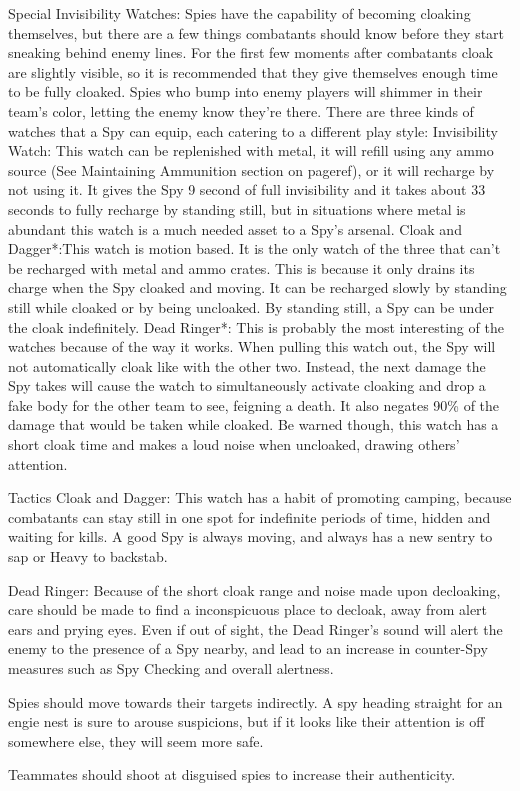 Special
Invisibility Watches: Spies have the capability of becoming cloaking themselves, but there are a few things combatants should know before they start sneaking behind enemy lines. For the first few moments after combatants cloak are slightly visible, so it is recommended that they give themselves enough time to be fully cloaked. Spies who bump into enemy players will shimmer in their team's color, letting the enemy know they're there. There are three kinds of watches that a Spy can equip, each catering to a different play style:
Invisibility Watch: This watch can be replenished with metal, it will refill using any ammo source (See Maintaining Ammunition section on {{pageref}}), or it will recharge by not using it. It gives the Spy 9 second of full invisibility and it takes about 33 seconds to fully recharge by standing still, but in situations where metal is abundant this watch is a much needed asset to a Spy's arsenal.
Cloak and Dagger*:This watch is motion based. It is the only watch of the three that can't be recharged with metal and ammo crates. This is because it only drains its charge when the Spy cloaked and moving. It can be recharged slowly by standing still while cloaked or by being uncloaked. By standing still, a Spy can be under the cloak indefinitely. 
Dead Ringer*: This is probably the most interesting of the watches because of the way it works. When pulling this watch out, the Spy will not automatically cloak like with the other two. Instead, the next damage the Spy takes will cause the watch to simultaneously activate cloaking and drop a fake body for the other team to see, feigning a death. It also negates 90\% of the damage that would be taken while cloaked. Be warned though, this watch has a short cloak time and makes a loud noise when uncloaked, drawing others' attention.

Tactics
Cloak and Dagger:  This watch has a habit of promoting camping, because combatants can stay still in one spot for indefinite periods of time, hidden and waiting for kills.  A good Spy is always moving, and always has a new sentry to sap or Heavy to backstab.

Dead Ringer: Because of the short cloak range and noise made upon decloaking, care should be made to find a inconspicuous place to decloak, away from alert ears and prying eyes.  Even if out of sight, the Dead Ringer's sound will alert the enemy to the presence of a Spy nearby, and lead to an increase in counter-Spy measures such as Spy Checking and overall alertness.

Spies should move towards their targets indirectly.  A spy heading straight for an engie nest is sure to arouse suspicions, but if it looks like their attention is off somewhere else, they will seem more safe.

Teammates should shoot at disguised spies to increase their authenticity.  